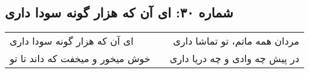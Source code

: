\begin{center}
\section*{شماره ۳۰: ای آن که هزار گونه سودا داری}
\label{sec:030}
\begin{longtable}{l p{0.5cm} r}
ای آن که هزار گونه سودا داری
&&
مردان همه ماتم، تو تماشا داری
\\
خوش میخور و میخفت که داند تا تو
&&
در پیش چه وادی و چه دریا داری
\\
\end{longtable}
\end{center}
